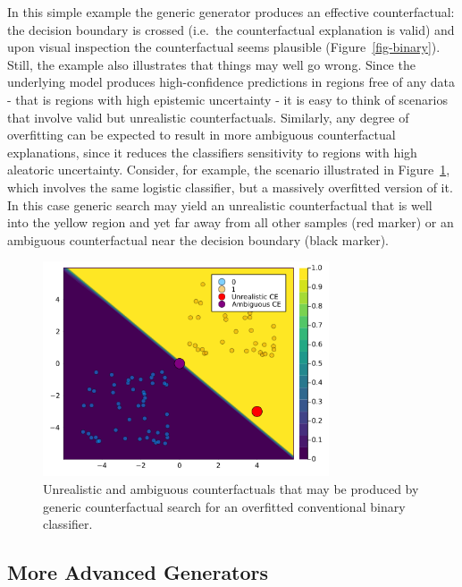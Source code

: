 \documentclass[
  letterpaper,
  DIV=11,
  numbers=noendperiod]{scrartcl}
\begin{document}
In this simple example the generic generator produces an effective
counterfactual: the decision boundary is crossed (i.e.~the
counterfactual explanation is valid) and upon visual inspection the
counterfactual seems plausible (Figure~\ref{fig-binary}). Still, the
example also illustrates that things may well go wrong. Since the
underlying model produces high-confidence predictions in regions free of
any data - that is regions with high epistemic uncertainty - it is easy
to think of scenarios that involve valid but unrealistic
counterfactuals. Similarly, any degree of overfitting can be expected to
result in more ambiguous counterfactual explanations, since it reduces
the classifiers sensitivity to regions with high aleatoric uncertainty.
Consider, for example, the scenario illustrated in
Figure~\ref{fig-binary-wrong}, which involves the same logistic
classifier, but a massively overfitted version of it. In this case
generic search may yield an unrealistic counterfactual that is well into
the yellow region and yet far away from all other samples (red marker)
or an ambiguous counterfactual near the decision boundary (black
marker).

\begin{figure}

{\centering \includegraphics[width=3.33333in,height=2.5in]{www/binary_wrong.png}

}

\caption{\label{fig-binary-wrong}Unrealistic and ambiguous
counterfactuals that may be produced by generic counterfactual search
for an overfitted conventional binary classifier.}

\end{figure}

\hypertarget{more-advanced-generators}{%
\subsection{More Advanced Generators}\label{more-advanced-generators}}
\end{document}
